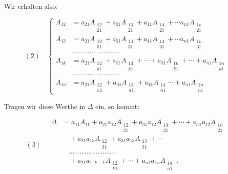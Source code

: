 \documentclass[11pt]{article}
\providecommand{\weberpage}[1]{}
\let\Delta\varDelta
\begin{document}
Wir erhalten also:

\[
(2)\quad
\left\{
\begin{aligned}
A_{12} &= a_{21}A_{\substack{12\\21}} + a_{31}A_{\substack{13\\21}} + a_{41}A_{\substack{14\\21}} + \cdots a_{n1}A_{\substack{1n\\21}}\\
A_{13} &= a_{21}A_{\substack{12\\31}} + a_{31}A_{\substack{13\\31}} + a_{41}A_{\substack{14\\31}} + \cdots a_{n1}A_{\substack{1n\\31}}\\
&\cdots\cdots\cdots\cdots\cdots\cdots\cdots\cdots\cdots\\
A_{1k} &= a_{21}A_{\substack{12\\k1}} + a_{31}A_{\substack{13\\k1}} + \cdots + a_{k1}A_{\substack{1k\\k1}} + \cdots + a_{n1}A_{\substack{1n\\k1}}\\
&\cdots\cdots\cdots\cdots\cdots\cdots\cdots\cdots\cdots\\
A_{1n} &= a_{21}A_{\substack{12\\n1}} + a_{31}A_{\substack{13\\n1}} + a_{41}A_{\substack{14\\n1}} \cdots + a_{n1}A_{\substack{1n\\n1}}
\end{aligned}
\right.
\]


\weberpage{68}
Tragen wir diese Werthe in $\Delta$ ein, so kommt:

\[
(3)\quad
\begin{aligned}
\Delta &= a_{11}A_{11} + a_{21}a_{12}A_{\substack{12\\21}} + a_{31}a_{12}A_{\substack{13\\21}} + \cdots + a_{n1}a_{12}A_{\substack{1n\\21}}\\
&\quad + a_{21}a_{13}A_{\substack{12\\31}} + a_{31}a_{13}A_{\substack{13\\31}} + \cdots\\
&\quad \cdots\cdots\cdots\cdots\cdots\cdots\cdots\cdots\cdots\\
&\quad + a_{21}a_{1,k-1}A_{\substack{12\\k1}} + \cdots + a_{n1}a_{1n}A_{\substack{1n\\n1}}\ .
\end{aligned}
\]
\end{document}

